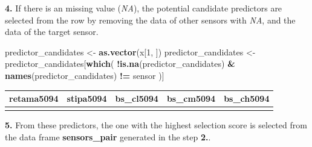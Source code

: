 \documentclass[]{article}
\newenvironment{Shaded}{\begin{snugshade}}{\end{snugshade}}
\newcommand{\DecValTok}[1]{\textcolor[rgb]{0.00,0.00,0.81}{#1}}
\newcommand{\KeywordTok}[1]{\textcolor[rgb]{0.13,0.29,0.53}{\textbf{#1}}}
\newcommand{\NormalTok}[1]{#1}
\newcommand{\OperatorTok}[1]{\textcolor[rgb]{0.81,0.36,0.00}{\textbf{#1}}}
\newcommand{\StringTok}[1]{\textcolor[rgb]{0.31,0.60,0.02}{#1}}
\begin{document}
\textbf{4.} If there is an missing value (\emph{NA}), the potential
candidate predictors are selected from the row by removing the data of
other sensors with \emph{NA}, and the data of the target sensor.

\begin{Shaded}
\begin{Highlighting}[]
\NormalTok{predictor_candidates <-}\StringTok{ }\KeywordTok{as.vector}\NormalTok{(x[}\DecValTok{1}\NormalTok{, ])}
\NormalTok{predictor_candidates <-}\StringTok{ }\NormalTok{predictor_candidates[}\KeywordTok{which}\NormalTok{(}
      \OperatorTok{!}\KeywordTok{is.na}\NormalTok{(predictor_candidates) }\OperatorTok{&}\StringTok{ }
\StringTok{        }\KeywordTok{names}\NormalTok{(predictor_candidates) }\OperatorTok{!=}\StringTok{ }\NormalTok{sensor}
\NormalTok{      )]}
\end{Highlighting}
\end{Shaded}

\begin{table}[H]
\centering
\begin{tabular}[t]{r|r|r|r|r}
\hline
retama5094 & stipa5094 & bs\_cl5094 & bs\_cm5094 & bs\_ch5094\\
\hline
\cellcolor{gray!6}{0.197} & \cellcolor{gray!6}{0.132} & \cellcolor{gray!6}{0.232} & \cellcolor{gray!6}{0.205} & \cellcolor{gray!6}{0.121}\\
\hline
\end{tabular}
\end{table}

\textbf{5.} From these predictors, the one with the highest selection
score is selected from the data frame \textbf{sensors\_pair} generated
in the step \textbf{2.}.

\begin{Shaded}
\end{Shaded}
\end{document}
